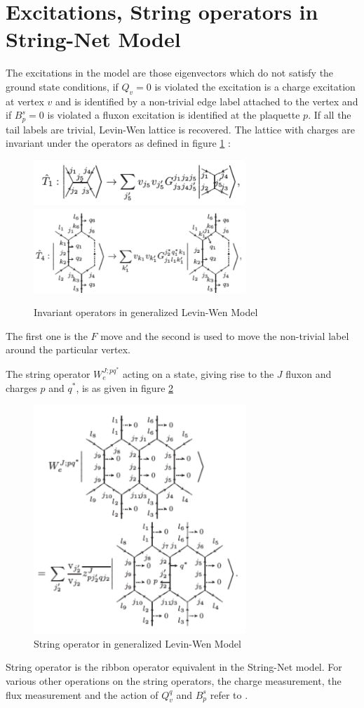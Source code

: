 \section{Excitations, String operators in String-Net Model}

The excitations in the model are those eigenvectors which do not satisfy the ground state conditions, if $Q_{v} = 0$ is violated the excitation
is a charge excitation at vertex $v$ and is identified by a non-trivial edge label attached to the vertex and if $B_{p}^{s}=0$ is violated 
a fluxon excitation is identified at the plaquette $p$. If all the tail labels are trivial, Levin-Wen lattice is recovered. The lattice with charges are 
invariant under the operators as defined in figure \ref{fig:T1_T4} :
\begin{figure}
\centering
\includegraphics[width=8cm]{T_1_Dyon.pdf}\\
\includegraphics[width=8cm]{T_4_Dyon.pdf}
\caption[Invariant operators in Dyonic model]{Invariant operators in generalized Levin-Wen Model}
\centering
\label{fig:T1_T4}
\end{figure}
The first one is the $F$ move and the second is used to move the non-trivial label around the particular vertex.

The string operator $W_{e}^{J;pq^{*}}$ acting on a state, giving rise to the $J$ fluxon and charges $p$ and $q^{*}$, is as 
given in figure \ref{fig:String_operator}
\begin{figure}
\centering
\includegraphics[width=8cm]{String_operator_dyon.pdf}
\caption[String operator in the Dyonic Model]{String operator in generalized Levin-Wen Model}
\centering
\label{fig:String_operator}
\end{figure}

String operator is the ribbon operator equivalent in the String-Net model. For various other operations on the string operators, the charge measurement,
the flux measurement and the action of $Q_{v}^{q}$ and $B_{p}^{s}$ refer to \citep{Reference6}.